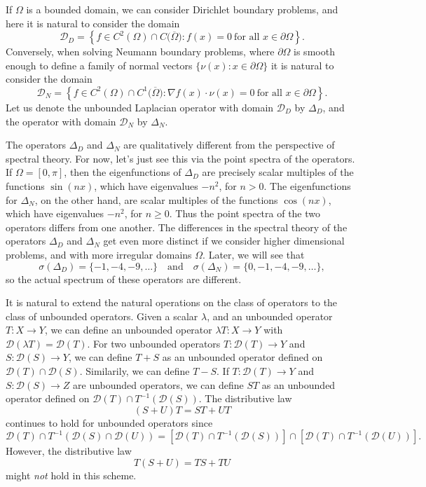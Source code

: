 \begin{example}
    If $\Omega$ is a bounded domain, we can consider Dirichlet boundary problems, and here it is natural to consider the domain
    \[ \mathcal{D}_D = \left\{ f \in C^2(\Omega) \cap C \big( \overline{\Omega} \big) : f(x) = 0\ \text{for all $x \in \partial \Omega$} \right\}. \]
    Conversely, when solving Neumann boundary problems, where $\partial \Omega$ is smooth enough to define a family of normal vectors $\{ \nu(x) : x \in \partial \Omega \}$ it is natural to consider the domain
    \[ \mathcal{D}_N = \left\{ f \in C^2(\Omega) \cap C^1 \big( \overline{\Omega} \big) : \nabla f(x) \cdot \nu(x) = 0\ \text{for all $x \in \partial \Omega$} \right\}. \]
    Let us denote the unbounded Laplacian operator with domain $\mathcal{D}_D$ by $\Delta_D$, and the operator with domain $\mathcal{D}_N$ by $\Delta_N$.
\end{example}

The operators $\Delta_D$ and $\Delta_N$ are qualitatively different from the perspective of spectral theory. For now, let's just see this via the point spectra of the operators. If $\Omega = [0,\pi]$, then the eigenfunctions of $\Delta_D$ are precisely scalar multiples of the functions $\sin(nx)$, which have eigenvalues $-n^2$, for $n > 0$. The eigenfunctions for $\Delta_N$, on the other hand, are scalar multiples of the functions $\cos(nx)$, which have eigenvalues $-n^2$, for $n \geq 0$. Thus the point spectra of the two operators differs from one another. The differences in the spectral theory of the operators $\Delta_D$ and $\Delta_N$ get even more distinct if we consider higher dimensional problems, and with more irregular domains $\Omega$. Later, we will see that
%
\[ \sigma(\Delta_D) = \{ -1, -4, -9, \dots \} \quad\text{and}\quad \sigma(\Delta_N) = \{ 0, -1, -4, -9, \dots \}, \]
%
so the actual spectrum of these operators are different.

It is natural to extend the natural operations on the class of operators to the class of unbounded operators. Given a scalar $\lambda$, and an unbounded operator $T: X \to Y$, we can define an unbounded operator $\lambda T: X \to Y$ with $\mathcal{D}(\lambda T) = \mathcal{D}(T)$. For two unbounded operators $T: \mathcal{D}(T) \to Y$ and $S: \mathcal{D}(S) \to Y$, we can define $T + S$ as an unbounded operator defined on $\mathcal{D}(T) \cap \mathcal{D}(S)$. Similarily, we can define $T - S$. If $T: \mathcal{D}(T) \to Y$ and $S: \mathcal{D}(S) \to Z$ are unbounded operators, we can define $ST$ as an unbounded operator defined on $\mathcal{D}(T) \cap T^{-1}(\mathcal{D}(S))$. The distributive law
%
\[ (S + U)T = ST + UT \]
%
continues to hold for unbounded operators since
%
\[ \mathcal{D}(T) \cap T^{-1}(\mathcal{D}(S) \cap \mathcal{D}(U)) = \left[ \mathcal{D}(T) \cap T^{-1}(\mathcal{D}(S)) \right] \cap \left[ \mathcal{D}(T) \cap T^{-1}(\mathcal{D}(U)) \right]. \]
%
However, the distributive law
%
\[ T(S + U) = TS + TU \]
%
might \emph{not} hold in this scheme.

